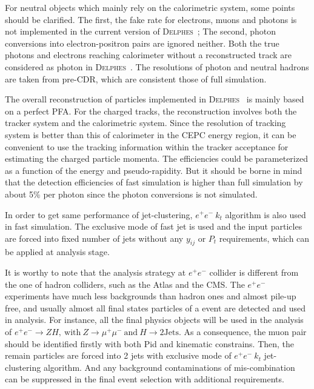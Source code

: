 \documentclass[a4paper,10pt,twoside]{cpc-hepnp}
\begin{document}
\begin{multicols}{2}
For neutral objects which mainly rely on the calorimetric system, some points should be clarified.
The first, the fake rate for electrons, muons and photons is not implemented in the current version of {\textsc{Delphes}~};
The second, photon conversions into electron-positron pairs are ignored neither.
Both the true photons and electrons reaching calorimeter without a reconstructed track are considered as photon in {\textsc{Delphes}~}.
The resolutions of photon and neutral hadrons are taken from pre-CDR, which are consistent those of full simulation.

The overall reconstruction of particles implemented in {\textsc{Delphes}~} is mainly based on a perfect PFA.
For the charged tracks, the reconstruction involves both the tracker system and the calorimetric system.
Since the resolution of tracking system is better than this of calorimeter in the CEPC energy region,
it can be convenient to use the tracking information within the tracker acceptance for estimating the charged particle momenta.
The efficiencies could be parameterized as a function of the energy and pseudo-rapidity. But it should be borne in mind
that the detection efficiencies of fast simulation is higher than full simulation by about 5\% per photon
since the photon conversions is not simulated.   



In order to get same performance of jet-clustering, $e^+e^-~k_t$ algorithm is also used in fast simulation.
The exclusive mode of fast jet is used and the input particles are forced into fixed number of jets
without any $y_{ij}$ or $P_t$ requirements, which can be applied at analysis stage.

It is worthy to note that the analysis strategy at $e^+e^-$ collider is different from the one of hadron colliders,
such as the Atlas and the CMS.  The $e^+e^-$ experiments have much less backgrounds than hadron ones and almost pile-up free,
and usually almost all final states particles of a event are detected and used in analysis.
For instance, all the final physics objects will be used in the analysis of
$e^+e^- \to ZH,~\mbox{with}~Z \to\mu^+\mu^-~\mbox{and}~H \to 2\mbox{Jets} $.
As a consequence, the muon pair should be identified firstly with both Pid and kinematic constrains.
Then, the remain particles are forced into 2 jets with exclusive mode of $e^+e^-~k_t$ jet-clustering algorithm.
And any background contaminations of mis-combination can be suppressed in the final event selection with additional requirements.



\end{multicols}
\end{document}
